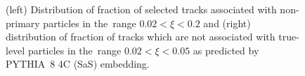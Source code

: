 \begin{figure}[h!]

	\caption{(left) Distribution of fraction of selected tracks  associated with non-primary particles  in the~range $0.02<\xi<0.2$ and  (right) distribution of fraction of tracks which are not associated with true-level particles  in the~range $0.02<\xi<0.05$ as predicted by PYTHIA~8 4C (SaS) embedding.}
	\label{fig:bkg_fake_charged}
\end{figure}
